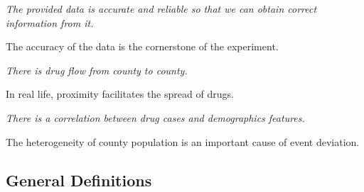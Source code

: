 \documentclass[a4paper]{article}
\begin{document}
\vspace{8pt}
\begin{assumption}
  \textit{The provided data is accurate and reliable so that we can obtain correct information from it.}
\end{assumption}
The accuracy of the data is the cornerstone of the experiment.

\vspace{8pt}
\begin{assumption}
  \textit{There is drug flow from county to county.}
\end{assumption}
In real life, proximity facilitates the spread of drugs.

\vspace{8pt}
\begin{assumption}
  \textit{There is a correlation between drug cases and demographics features.}
\end{assumption}
The heterogeneity of county population is an important cause of event deviation.

\subsection{General Definitions}
\end{document}
